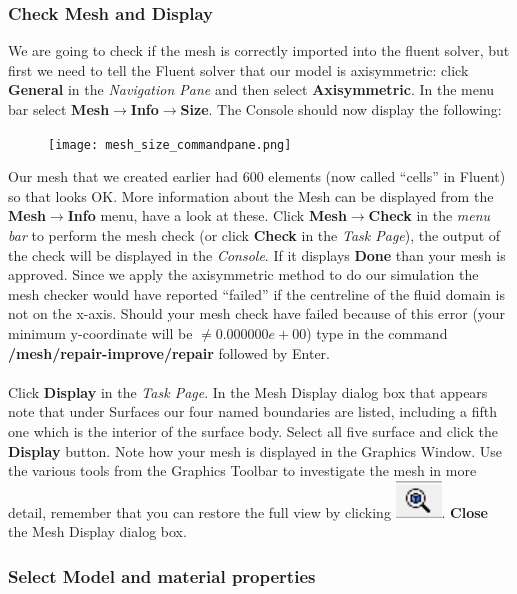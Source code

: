 \documentclass[11pt,a4paper,oneside]{scrartcl}
\newcommand\bfr[1]{\textcolor[rgb]{1,0.00,0.00}{\textbf{\textsf{#1}}}}
\begin{document}
\subsubsection{Check Mesh and Display}
We are going to check if the mesh is correctly imported into the fluent solver, but first we need to tell the Fluent solver that our model is axisymmetric: click \bfr{General} in the \emph{Navigation Pane} and then select \bfr{Axisymmetric}.
In the menu bar select \bfr{Mesh$\rightarrow$Info$\rightarrow$Size}. The Console should now display the following:
\begin{figure}[H]
\begin{center}
\texttt{[image: mesh\_size\_commandpane.png]}
\end{center}
\end{figure}
Our mesh that we created earlier had 600 elements (now called ``cells'' in Fluent) so that looks OK. More information about the Mesh can be displayed from the \bfr{Mesh$\rightarrow$Info} menu, have a look at these.
Click \bfr{Mesh$\rightarrow$Check} in the \emph{menu bar} to perform the mesh check (or click \bfr{Check} in the \emph{Task Page}), the output of the check will be displayed in the \emph{Console}. If it displays \bfr{Done} than your mesh is approved. Since we apply the axisymmetric method to do our simulation the mesh checker would have reported ``failed'' if the centreline of the fluid domain is not on the x-axis. Should your mesh check have failed because of this error (your minimum y-coordinate will be $\neq0.000000e+00$) type in the command {\bf/mesh/repair-improve/repair} followed by Enter.
\\
\\
Click \bfr{Display} in the \emph{Task Page}. In the Mesh Display dialog box that appears note that under Surfaces our four named boundaries are listed, including a fifth one which is the interior of the surface body. Select all five surface and click the \bfr{Display} button. Note how your mesh is displayed in the Graphics Window. Use the various tools from the Graphics Toolbar to investigate the mesh in more detail, remember that you can restore the full view by clicking \includegraphics[width=.5cm]{zoom_to_fit.png}. \bfr{Close} the Mesh Display dialog box.

\subsubsection{Select Model and material properties}
\end{document}

